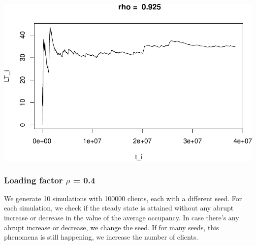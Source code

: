 \documentclass[]{article}
\begin{document}
\includegraphics{003_files/figure-latex/unnamed-chunk-11-4.pdf}

\subsubsection{\texorpdfstring{Loading factor \(\rho\) =
0.4}{Loading factor \textbackslash{}rho = 0.4}}\label{loading-factor-rho-0.4}

We generate 10 simulations with 100000 clients, each with a different
seed. For each simulation, we check if the steady state is attained
without any abrupt increase or decrease in the value of the average
occupancy. In case there's any abrupt increase or decrease, we change
the seed. If for many seeds, this phenomena is still happening, we
increase the number of clients.
\end{document}
